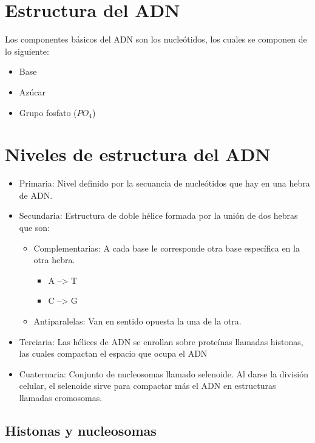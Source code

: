 \section{Estructura del ADN}

Los componentes básicos del ADN son los nucleótidos, los cuales se componen de lo siguiente:

\begin{itemize}
    \item Base
    \item Azúcar
    \item Grupo fosfato ($PO_{4}$)
\end{itemize}

\section{Niveles de estructura del ADN}

\begin{itemize}
    \item Primaria: Nivel definido por la secuancia de nucleótidos que hay en una hebra de ADN.
    
    \item Secundaria: Estructura de doble hélice formada por la unión de dos hebras que son:
	    \begin{itemize}
	        \item Complementarias: A cada base le corresponde otra base específica en la otra hebra.
	    	    \begin{itemize}    
	    	        \item A --> T
	    	        \item C --> G
	    	    \end{itemize}
	        \item Antiparalelas: Van en sentido opuesta la una de la otra.
	    \end{itemize}
    
    \item Terciaria: Las hélices de ADN se enrollan sobre proteínas llamadas histonas, las cuales compactan el espacio que ocupa el ADN

    \item Cuaternaria: Conjunto de nucleosomas llamado selenoide. Al darse la división celular, el selenoide sirve para compactar más el ADN en estructuras llamadas cromosomas.
\end{itemize}

\subsection{Histonas y nucleosomas}

